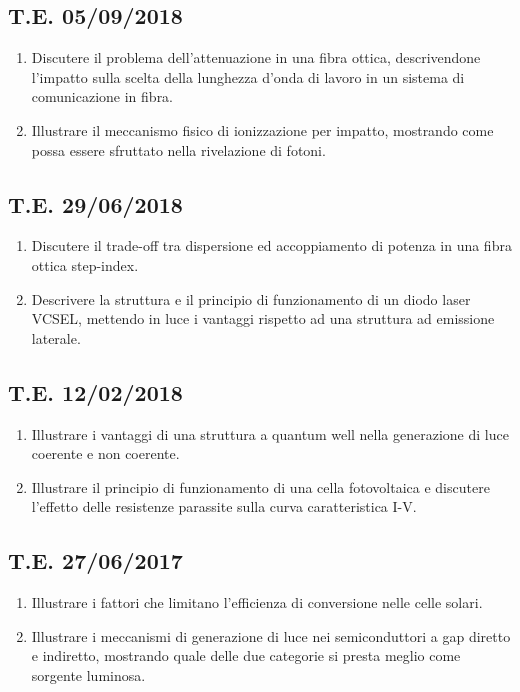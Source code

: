 \documentclass[9pt]{extarticle}
\begin{document}
\subsection{T.E. 05/09/2018}
\begin{enumerate}
  \item Discutere il problema dell’attenuazione in una fibra ottica, descrivendone l’impatto sulla scelta della lunghezza
        d’onda di lavoro in un sistema di comunicazione in fibra.
  \item Illustrare il meccanismo fisico di ionizzazione per impatto, mostrando come possa essere sfruttato nella
        rivelazione di fotoni.
\end{enumerate}

\subsection{T.E. 29/06/2018}
\begin{enumerate}
  \item Discutere il trade-off tra dispersione ed accoppiamento di potenza in una fibra ottica step-index.
  \item Descrivere la struttura e il principio di funzionamento di un diodo laser VCSEL, mettendo in luce i vantaggi
        rispetto ad una struttura ad emissione laterale.
\end{enumerate}

\subsection{T.E. 12/02/2018}
\begin{enumerate}
  \item Illustrare i vantaggi di una struttura a quantum well nella generazione di luce coerente e non coerente.
  \item Illustrare il principio di funzionamento di una cella fotovoltaica e discutere l’effetto delle resistenze parassite sulla
        curva caratteristica I-V.
\end{enumerate}

\subsection{T.E. 27/06/2017}
\begin{enumerate}
  \item Illustrare i fattori che limitano l’efficienza di conversione nelle celle solari.
  \item Illustrare i meccanismi di generazione di luce nei semiconduttori a gap diretto e indiretto, mostrando quale delle
        due categorie si presta meglio come sorgente luminosa.
\end{enumerate}
\end{document}

